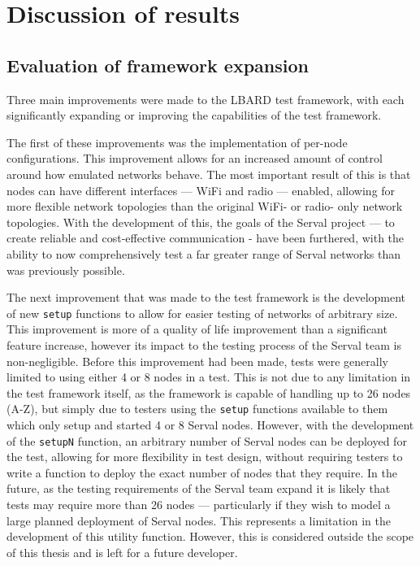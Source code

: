 
\chapter{Discussion of results} %

\label{Chapter7} %


\section{Evaluation of framework expansion}
Three main improvements were made to the LBARD test framework, with each significantly expanding or improving the capabilities of the test framework.

The first of these improvements was the implementation of per-node configurations.
This improvement allows for an increased amount of control around how emulated networks behave.
The most important result of this is that nodes can have different interfaces — WiFi and radio — enabled, allowing for more flexible network topologies than the original WiFi- or radio- only network topologies.
With the development of this, the goals of the Serval project — to create reliable and cost-effective communication - have been furthered, with the ability to now comprehensively test a far greater range of Serval networks than was previously possible.

The next improvement that was made to the test framework is the development of new \texttt{setup} functions to allow for easier testing of networks of arbitrary size.
This improvement is more of a quality of life improvement than a significant feature increase, however its impact to the testing process of the Serval team is non-negligible.
Before this improvement had been made, tests were generally limited to using either 4 or 8 nodes in a test. 
This is not due to any limitation in the test framework itself, as the framework is capable of handling up to 26 nodes (A-Z), but simply due to testers using the \texttt{setup} functions available to them which only setup and started 4 or 8 Serval nodes.
However, with the development of the \texttt{setupN} function, an arbitrary number of Serval nodes can be deployed for the test, allowing for more flexibility in test design, without requiring testers to write a function to deploy the exact number of nodes that they require.
In the future, as the testing requirements of the Serval team expand it is likely that tests may require more than 26 nodes — particularly if they wish to model a large planned deployment of Serval nodes.
This represents a limitation in the development of this utility function.
However, this is considered outside the scope of this thesis and is left for a future developer.

